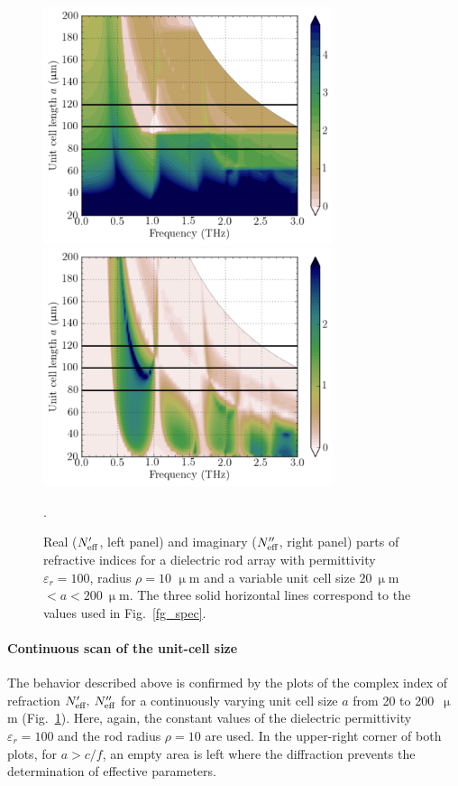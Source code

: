 \documentclass[letterpaper,12pt]{report}
\begin{document}
\begin{figure}[h]\centering
    \includegraphics[width=8.5cm]{img/ERods_eps100_spacingscan_Nim.pdf}
    \includegraphics[width=8.5cm]{img/ERods_eps100_spacingscan_Nre.pdf}
\caption{Real ($N_{\text{eff} }'$, left panel) and imaginary ($N_{\text{eff} }''$, right panel) parts of
refractive indices for a dielectric rod array with permittivity $\varepsilon_r =100$,
radius $\rho = 10$ $\upmu$m and a variable unit cell size $20\:\upmu$m $<a<200\:\upmu$m. 
The three solid horizontal lines correspond to the values used in Fig.~\ref{fg_spec}.}
\label{fg_spacingscan100}. 

\end{figure}

\paragraph{Continuous scan of the unit-cell size}
The behavior described above is confirmed by the plots of the complex index of refraction
$N_{\text{eff} }',\: N_{\text{eff} }''$ for a continuously varying unit cell size $a$ from 20 to 200~$\upmu$m
(Fig.~\ref{fg_spacingscan100}). Here, again, the constant values of the dielectric
permittivity $\varepsilon_r=100$ and the rod radius $\rho=10$ \um are used. In the
upper-right corner of both plots, for $a>c/f$, an empty area is left where the
diffraction prevents the determination of effective parameters. 
\end{document}
